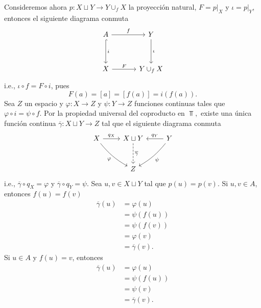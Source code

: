 \begin{ejemplo}
    Consideremos ahora $p:X\sqcup Y\to Y\cup_f X$ la proyección natural, $F=p|_X$ y $\iota=p|_Y$, entonces el siguiente diagrama conmuta
    \begin{equation*}
        \begin{tikzcd}[column sep =1.2cm, row sep=1.2cm]
            A\arrow["f",r]\arrow["i",d, hook] & Y\arrow["\iota",d]\\
            X\arrow["F",r] & Y\cup_f X
        \end{tikzcd}
    \end{equation*}
    i.e., $\iota\circ f=F\circ i$, pues 
    $$F(a)=[a]=[f(a)]=i(f(a)).$$ Sea $Z$ un espacio y $\varphi:X\to Z$ y $\psi:Y\to Z$ funciones continuas tales que $\varphi\circ i=\psi\circ f$. Por la propiedad universal del coproducto en $\Top,$ existe una única función continua $\overline{\gamma}: X\sqcup Y\to Z$ tal que el siguiente diagrama conmuta
    \begin{equation*}
        \begin{tikzcd}[row sep = 1cm]
            X\arrow[r,"q_X"]\arrow[rd, bend right=10, "\varphi"'] & X\sqcup Y \arrow[d, dashed, "\overline{\gamma}"] & Y \arrow[l, "q_Y"'] \arrow[dl, bend left=10, "\psi"] \\
                             & Z & 
        \end{tikzcd}
    \end{equation*}
    i.e., $\overline{\gamma}\circ q_X=\varphi$ y $\overline{\gamma}\circ q_Y=\psi$. Sea $u,v\in X\sqcup Y$ tal que $p(u)=p(v).$ Si $u,v\in A$, entonces $f(u)=f(v)$
    \begin{align*}
        \overline{\gamma}(u)&=\varphi(u)\\
        &=\psi(f(u))\\
        &=\psi(f(v))\\
        &=\varphi(v)\\
        &= \overline{\gamma}(v).
    \end{align*}
    Si $u\in A$ y $f(u)=v$, entonces 
    \begin{align*}
        \overline{\gamma}(u)&=\varphi(u)\\
        &=\psi(f(u))\\
        &=\psi(v)\\
        &=\overline{\gamma}(v).
    \end{align*}
    

\end{ejemplo}
